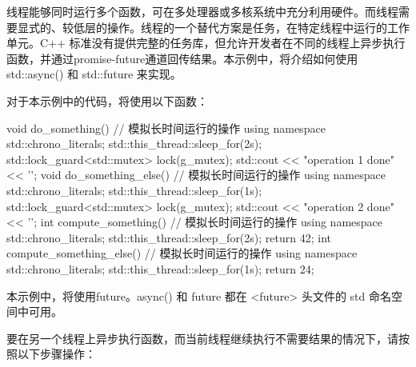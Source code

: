 线程能够同时运行多个函数，可在多处理器或多核系统中充分利用硬件。而线程需要显式的、较低层的操作。线程的一个替代方案是任务，在特定线程中运行的工作单元。C++ 标准没有提供完整的任务库，但允许开发者在不同的线程上异步执行函数，并通过promise-future通道回传结果。本示例中，将介绍如何使用 std::async() 和 std::future 来实现。


对于本示例中的代码，将使用以下函数：

\begin{cpp}
void do_something()
{
    // 模拟长时间运行的操作
    {
        using namespace std::chrono_literals;
        std::this_thread::sleep_for(2s);
    }
    std::lock_guard<std::mutex> lock(g_mutex);
    std::cout << "operation 1 done" << '\n';
}
void do_something_else()
{
    // 模拟长时间运行的操作
    {
        using namespace std::chrono_literals;
        std::this_thread::sleep_for(1s);
    }
    std::lock_guard<std::mutex> lock(g_mutex);
    std::cout << "operation 2 done" << '\n';
}
int compute_something()
{
    // 模拟长时间运行的操作
    {
        using namespace std::chrono_literals;
        std::this_thread::sleep_for(2s);
    }
    return 42;
}
int compute_something_else()
{
    // 模拟长时间运行的操作
    {
        using namespace std::chrono_literals;
        std::this_thread::sleep_for(1s);
    }
    return 24;
}
\end{cpp}

本示例中，将使用future。async() 和 future 都在 <future> 头文件的 std 命名空间中可用。


要在另一个线程上异步执行函数，而当前线程继续执行不需要结果的情况下，请按照以下步骤操作：

